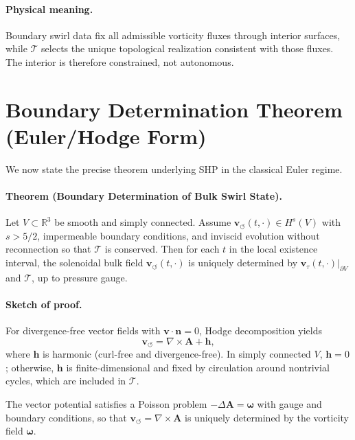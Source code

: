 \documentclass[11pt]{article}
\begin{document}
    \paragraph{Physical meaning.}
        Boundary swirl data fix all admissible vorticity fluxes through interior surfaces,
        while $\mathcal{T}$ selects the unique topological realization consistent with
        those fluxes. The interior is therefore constrained, not autonomous.

    \section{Boundary Determination Theorem (Euler/Hodge Form)}

    We now state the precise theorem underlying SHP in the classical Euler regime.

    \paragraph{Theorem (Boundary Determination of Bulk Swirl State).}
        Let $V\subset\mathbb{R}^3$ be smooth and simply connected.
        Assume $\mathbf{v}_{\!\boldsymbol{\circlearrowleft}}(t,\cdot)\in H^s(V)$ with
        $s>5/2$, impermeable boundary conditions, and inviscid evolution without
        reconnection so that $\mathcal{T}$ is conserved.
        Then for each $t$ in the local existence interval, the solenoidal bulk field
        $\mathbf{v}_{\!\boldsymbol{\circlearrowleft}}(t,\cdot)$ is uniquely determined
        by $\mathbf{v}_\tau(t,\cdot)|_{\partial V}$ and $\mathcal{T}$, up to pressure gauge.

    \paragraph{Sketch of proof.}
        For divergence-free vector fields with $\mathbf{v}\cdot\mathbf{n}=0$, Hodge
        decomposition yields
        \begin{equation}
            \mathbf{v}_{\!\boldsymbol{\circlearrowleft}}
            = \nabla\times\mathbf{A} + \mathbf{h},
        \end{equation}
        where $\mathbf{h}$ is harmonic (curl-free and divergence-free).
        In simply connected $V$, $\mathbf{h}=0$; otherwise, $\mathbf{h}$ is finite-dimensional
        and fixed by circulation around nontrivial cycles, which are included in
        $\mathcal{T}$.

        The vector potential satisfies a Poisson problem
        $-\Delta\mathbf{A}=\boldsymbol{\omega}$ with gauge and boundary conditions,
        so that $\mathbf{v}_{\!\boldsymbol{\circlearrowleft}}=\nabla\times\mathbf{A}$
        is uniquely determined by the vorticity field $\boldsymbol{\omega}$.
\end{document}
